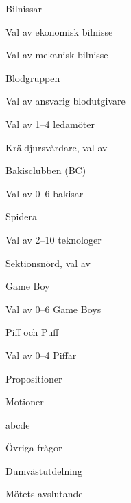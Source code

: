\documentclass{sektionsmote}
\begin{document}
\begin{ootd}
\begin{ootd}
    \item Bilnissar
    \begin{ootd}
        \item Val av ekonomisk bilnisse
        \item Val av mekanisk bilnisse
    \end{ootd}
    \item Blodgruppen
    \begin{ootd}
        \item Val av ansvarig blodutgivare
        \item Val av 1--4 ledamöter
    \end{ootd}
    \item Kräldjursvårdare, val av
    \item Bakisclubben (BC)
    \begin{ootd}
        \item Val av 0--6 bakisar
    \end{ootd}
    \item Spidera
    \begin{ootd}
        \item Val av 2--10 teknologer
    \end{ootd}
    \item Sektionsnörd, val av
    \item Game Boy
    \begin{ootd}
        \item Val av 0--6 Game Boys
    \end{ootd}
    \item Piff och Puff
    \begin{ootd}
        \item Val av 0--4 Piffar
    \end{ootd}
\end{ootd}

\item{Propositioner}

\item{Motioner}
\begin{ootd}
    \item abcde
\end{ootd}

\item{Övriga frågor}

\item{Dumvästutdelning}

\item{Mötets avslutande}
\end{ootd}


\begin{bilagor}



\end{bilagor}
\end{document}
